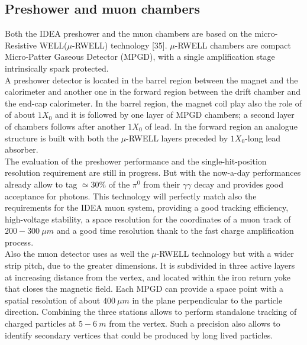 \subsection{Preshower and muon chambers}
Both the IDEA preshower and the muon chambers are based on the micro-Resistive WELL($\mu$-RWELL) technology [35]. $\mu$-RWELL chambers are compact Micro-Patter Gaseous Detector (MPGD), with a single amplification stage intrinsically spark protected.\\

A preshower detector is located in the barrel region between the magnet and the calorimeter and another one in the forward region between the drift chamber and the end-cap calorimeter.
In the barrel region, the magnet coil play also the role of of about $1 X_0$ and it is followed by one layer of MPGD chambers; a second layer of chambers follows after another $1 X_0$ of lead. In the forward region an analogue structure is built with both the $\mu$-RWELL layers preceded by $1 X_0$-long lead absorber.\\
The evaluation of the preshower performance and the single-hit-position resolution requirement are still in progress.
But with the now-a-day performances already allow to tag $\simeq 30\%$ of the $\pi^0$ from their $\gamma\gamma$ decay and provides good acceptance for photons.
This technology will perfectly match also the requirements for the IDEA muon system, providing a good tracking efficiency, high-voltage stability, a space resolution for the coordinates of a muon track of $200-300\ \mu m$ and a good time resolution thank to the fast charge amplification process.\\

Also the muon detector uses as well the $\mu$-RWELL technology but with a wider strip pitch, due to the greater dimensions. It is subdivided in three active layers at increasing distance from the vertex, and located within the iron return yoke that closes the magnetic field. Each MPGD can provide a space point with a spatial resolution of about $400\ \mu m$ in the plane perpendicular to the particle direction. Combining the three stations allows to perform standalone tracking of charged particles at $5-6\ m$ from the vertex. Such a precision also allows to identify secondary vertices that could be produced by long lived particles.